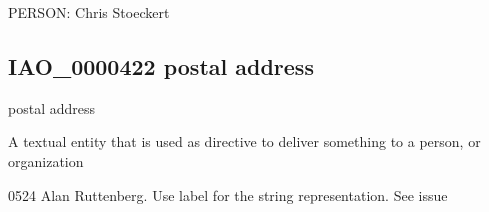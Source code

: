 \documentclass[letterpaper,10pt,english]{sphinxmanual}
\begin{document}
\begin{sphinxShadowBox}

\sphinxAtStartPar
PERSON: Chris Stoeckert
\end{sphinxShadowBox}
\begin{quote}

\ignorespaces \end{quote}


\subsection{IAO\_0000422 \sphinxhyphen{} postal address}
\label{\detokenize{doc-IAO_0000422:iao-0000422-postal-address}}\label{\detokenize{doc-IAO_0000422:index-0}}\label{\detokenize{doc-IAO_0000422::doc}}
\begin{sphinxShadowBox}

\sphinxAtStartPar
postal address
\end{sphinxShadowBox}

\begin{sphinxShadowBox}

\sphinxAtStartPar
{\hyperref[\detokenize{doc-IAO_0000030::doc}]{}}
\end{sphinxShadowBox}

\begin{sphinxShadowBox}

\sphinxAtStartPar
A textual entity that is used as directive to deliver something to a person, or organization
\end{sphinxShadowBox}

\begin{sphinxShadowBox}

\sphinxhyphen{}05\sphinxhyphen{}24 Alan Ruttenberg. Use label for the string representation. See issue 
\end{sphinxShadowBox}

\begin{sphinxShadowBox}

\sphinxAtStartPar
{}
\end{sphinxShadowBox}
\begin{quote}

\ignorespaces \end{quote}
\end{document}

